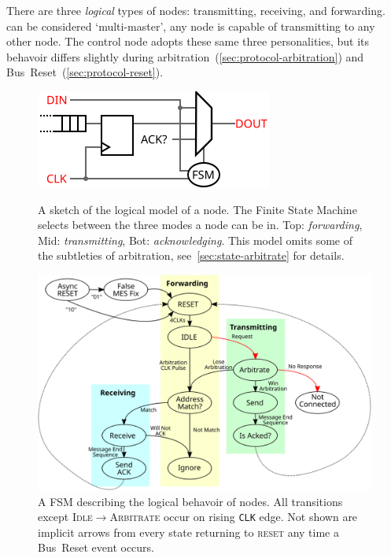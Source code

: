 There are three {\em logical} types of \bus nodes: transmitting, receiving,
and forwarding. \bus can be considered `multi-master', any node is capable of
transmitting to any other node. The control node adopts these same three
personalities, but its behavoir differs slightly during
arbitration~(\ref{sec:protocol-arbitration}) and
Bus~Reset~(\ref{sec:protocol-reset}).

\begin{figure}[h]
  \begin{minipage}[b]{.48\linewidth}
    \centering
    \includegraphics[width=\textwidth]{img/logical}
    \caption{A sketch of the logical model of a node. The Finite State Machine
  selects between the three modes a node can be in. Top: {\em forwarding}, Mid:
  {\em transmitting}, Bot: {\em acknowledging}. This model omits some of the
  subtleties of arbitration, see~\ref{sec:state-arbitrate} for details.
    }
    \label{fig:logical}
  \end{minipage}
  \hspace{1 em}
  \begin{minipage}[b]{.48\linewidth}
    \centering
    \label{fig:states}
  \end{minipage}
\end{figure}

\begin{figure}[h]
  \includegraphics[width=\linewidth]{img/fsm_diagram}
  \caption{A FSM describing the logical behavoir of \bus nodes. All
transitions except \textsc{Idle}$\rightarrow$\textsc{Arbitrate} occur on
rising {\tt CLK} edge. Not shown are implicit arrows from every state returning to
\textsc{reset} any time a Bus~Reset event occurs.}
\end{figure}

